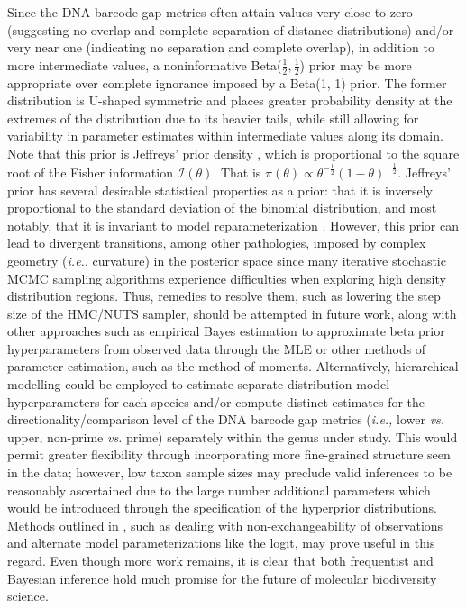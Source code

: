 \documentclass[12pt]{article}
\begin{document}
Since the DNA barcode gap metrics often attain values very close to zero (suggesting no overlap and complete separation of distance distributions) and/or very near one (indicating no separation and complete overlap), in addition to more intermediate values, a noninformative Beta($\frac{1}{2}, \frac{1}{2}$) prior may be more appropriate over complete ignorance imposed by a Beta(1, 1) prior. The former distribution is U-shaped symmetric and places greater probability density at the extremes of the distribution due to its heavier tails, while still allowing for variability in parameter estimates within intermediate values along its domain. Note that this prior is Jeffreys' prior density \citep{jeffreys1946invariant}, which is  proportional to the square root of the Fisher information $\mathcal{I}(\theta)$. That is
$\pi(\theta) \propto \theta^{-\frac{1}{2}}(1-\theta)^{-\frac{1}{2}}$. Jeffreys' prior has several desirable statistical  properties as a prior: that it is inversely proportional to the standard deviation of the binomial distribution, and most notably, that it is invariant to model reparameterization \citep{gelman2014bayesian}. However, this prior can lead to divergent transitions, among other pathologies, imposed by complex geometry (\textit{i.e.}, curvature) in the posterior space since many iterative stochastic MCMC sampling algorithms experience difficulties when exploring high density distribution regions. Thus, remedies to resolve them, such as lowering the step size of the HMC/NUTS sampler, should be attempted in future work, along with other approaches such as empirical Bayes estimation to approximate beta prior hyperparameters from observed data through the MLE or other methods of parameter estimation, such as the method of moments. Alternatively, hierarchical modelling could be employed to estimate separate distribution model hyperparameters for each species and/or compute distinct estimates for the directionality/comparison level of the DNA barcode gap metrics (\textit{i.e.,} lower \textit{vs.} upper, non-prime \textit{vs.} prime) separately within the genus under study. This would permit greater flexibility through incorporating more fine-grained structure seen in the data; however, low taxon sample sizes may preclude valid inferences to be reasonably ascertained due to the large number additional parameters which would be introduced through the specification of the hyperprior distributions. Methods outlined in \citet{gelman2014bayesian}, such as dealing with non-exchangeability of observations and alternate model parameterizations like the logit, may prove useful in this regard.  Even though more work remains, it is clear that both frequentist and Bayesian inference hold much promise for the future of molecular biodiversity science.
\end{document}
